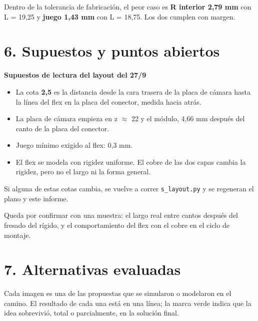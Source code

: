 \documentclass[11pt,a4paper]{article}
\newenvironment{notainferencia}[1]
  {\begin{notainferenciabase}{\sffamily\scriptsize\bfseries\color{green}#1}\par\vspace{2pt}}
  {\end{notainferenciabase}}
\begin{document}
Dentro de la tolerancia de fabricación, el peor caso es \textbf{R interior 2,79 mm} con L = 19,25 y \textbf{juego 1,43 mm} con L = 18,75. Los dos cumplen con margen.

\clearpage

\section*{6. Supuestos y puntos abiertos}

\begin{notainferencia}{Supuestos de lectura del layout del 27/9}
\begin{itemize}
\item La cota \textbf{2,5} es la distancia desde la cara trasera de la placa de cámara hasta la línea del flex en la placa del conector, medida hacia atrás.
\item La placa de cámara empieza en z $\approx$ 22 y el módulo, 4,66 mm después del canto de la placa del conector.
\item Juego mínimo exigido al flex: 0,3 mm.
\item El flex se modela con rigidez uniforme. El cobre de las dos capas cambia la rigidez, pero no el largo ni la forma general.
\end{itemize}

Si alguna de estas cotas cambia, se vuelve a correr \texttt{s\_layout.py} y se regeneran el plano y este informe.

\end{notainferencia}
Queda por confirmar con una muestra: el largo real entre cantos después del fresado del rígido, y el comportamiento del flex con el cobre en el ciclo de montaje.

\clearpage

\section*{7. Alternativas evaluadas}

Cada imagen es una de las propuestas que se simularon o modelaron en el camino. El resultado de cada una está en una línea; la marca verde indica que la idea sobrevivió, total o parcialmente, en la solución final.
\end{document}
